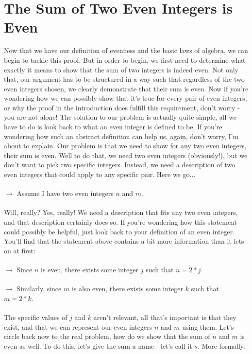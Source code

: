 \documentclass[a4paper,12pt]{article}
\begin{document}
\section{The Sum of Two Even Integers is Even}
Now that we have our definition of evenness and the basic laws of algebra, we can begin to tackle this proof. But in order to begin, we first need to determine what exactly it means to show that the sum of two integers is indeed even. Not only that, our argument has to be structured in a way such that regardless of the two even integers chosen, we clearly demonstrate that their sum is even. Now if you're wondering how we can possibly show that it's true for every pair of even integers, or why the proof in the introduction does fulfill this requirement, don't worry - you are not alone! The solution to our problem is actually quite simple, all we have to do is look back to what an even integer is defined to be. If you're wondering how such an abstract definition can help us, again, don't worry, I'm about to explain. Our problem is that we need to show for any two even integers, their sum is even. Well to do that, we need two even integers (obviously!), but we don't want to pick two specific integers. Instead, we need a description of two even integers that could apply to any specific pair. Here we go...\\
\\
$\rightarrow$ Assume I have two even integers $n$ and $m$. \\
\\
Will, really? Yes, really! We need a description that fits any two even integers, and that description certainly does so. If you're wondering how this statement could possibly be helpful, just look back to your definition of an even integer. You'll find that the statement above contains a bit more information than it lets on at first: \\
\\
$\rightarrow$ Since $n$ is even, there exists some integer $j$ such that $n = 2*j$. \\
\\
$\rightarrow$ Similarly, since $m$ is also even, there exists some integer $k$ such that $m = 2*k$. \\
\\
The specific values of $j$ and $k$ aren't relevant, all that's important is that they exist, and that we can represent our even integers $n$ and $m$ using them. Let's circle back now to the real problem, how do we show that the sum of $n$ and $m$ is even as well. To do this, let's give the sum a name - let's call it $s$. More formally:\\ 
\end{document}
